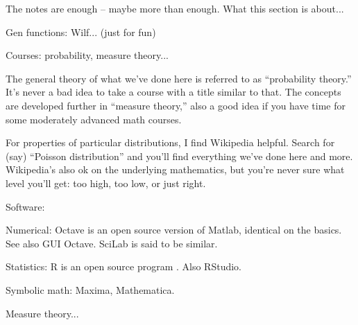 The notes are enough -- maybe more than enough.
What this section is about...



Gen functions:  Wilf...  (just for fun)

Courses:  probability, measure theory...

The general theory of what we've done here is referred to as ``probability theory.''
It's never a bad idea to take a course with a title similar to that.
The concepts are developed further in ``measure theory,''
also a good idea if you have time for some moderately advanced math courses.

For properties of particular distributions, I find Wikipedia helpful.
Search for (say) ``Poisson distribution'' and you'll find everything we've done here
and more.
Wikipedia's also ok on the underlying mathematics, but you're never sure what
level you'll get:  too high, too low, or just right.

Software:

Numerical:  Octave is an open source version of Matlab, identical on the basics.
See also GUI Octave.
SciLab is said to be similar.

Statistics:  R is an open source program .  Also RStudio.

Symbolic math:  Maxima, Mathematica.


Measure theory...



